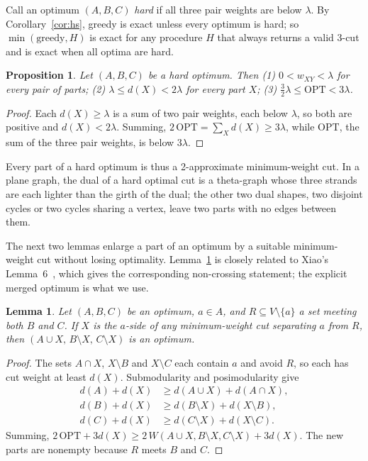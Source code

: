 \documentclass[preprint,12pt]{elsarticle}
\newtheorem{proposition}[theorem]{Proposition}
\newtheorem{lemma}[theorem]{Lemma}
\theoremstyle{definition}
\newcommand{\OPT}{\mathrm{OPT}}
\newcommand{\greedy}{\mathrm{greedy}}
\begin{document}
Call an optimum $(A,B,C)$ \emph{hard} if all three pair weights are below $\lambda$. By
Corollary~\ref{cor:hs}, greedy is exact unless every optimum is hard; so $\min(\greedy,H)$ is exact for
any procedure $H$ that always returns a valid 3-cut and is exact when all optima are hard.

\begin{proposition}\label{prop:hard}
Let $(A,B,C)$ be a hard optimum. Then
(1) $0<w_{XY}<\lambda$ for every pair of parts;
(2) $\lambda\le d(X)<2\lambda$ for every part $X$;
(3) $\tfrac32\lambda\le\OPT<3\lambda$.
\end{proposition}

\begin{proof}
Each $d(X)\ge\lambda$ is a sum of two pair weights, each below $\lambda$, so both are positive and
$d(X)<2\lambda$. Summing, $2\,\OPT=\sum_X d(X)\ge3\lambda$, while $\OPT$, the sum of the three pair
weights, is below $3\lambda$.
\end{proof}

Every part of a hard optimum is thus a 2-approximate minimum-weight cut. In a plane graph, the dual of
a hard optimal cut is a theta-graph whose three strands are each lighter than the girth of the dual;
the other two dual shapes, two disjoint cycles or two cycles sharing a vertex, leave two parts with no
edges between them.

The next two lemmas enlarge a part of an optimum by a suitable minimum-weight cut without losing
optimality. Lemma~\ref{lem:merge-cut} is closely related to Xiao's Lemma~6~\cite{Xiao2008}, which gives
the corresponding non-crossing statement; the explicit merged optimum is what we use.

\begin{lemma}\label{lem:merge-cut}
Let $(A,B,C)$ be an optimum, $a\in A$, and $R\subseteq V\setminus\{a\}$ a set meeting both $B$ and $C$.
If $X$ is the $a$-side of any minimum-weight cut separating $a$ from $R$, then
$(A\cup X,\,B\setminus X,\,C\setminus X)$ is an optimum.
\end{lemma}

\begin{proof}
The sets $A\cap X$, $X\setminus B$ and $X\setminus C$ each contain $a$ and avoid $R$, so each has cut
weight at least $d(X)$. Submodularity and posimodularity give
\begin{align*}
d(A)+d(X)&\ge d(A\cup X)+d(A\cap X),\\
d(B)+d(X)&\ge d(B\setminus X)+d(X\setminus B),\\
d(C)+d(X)&\ge d(C\setminus X)+d(X\setminus C).
\end{align*}
Summing, $2\,\OPT+3d(X)\ge 2\,W(A\cup X,B\setminus X,C\setminus X)+3d(X)$. The new parts are nonempty
because $R$ meets $B$ and $C$.
\end{proof}
\end{document}
